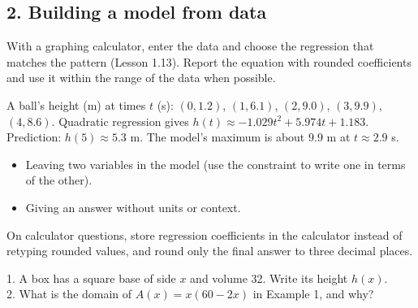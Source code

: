 \subsection*{2. Building a model from data}
With a graphing calculator, enter the data and choose the regression that matches the pattern (Lesson 1.13). Report the equation with rounded coefficients and use it within the range of the data when possible.

\begin{example}
A ball's height (m) at times $t$ (s): $(0,1.2)$, $(1,6.1)$, $(2,9.0)$, $(3,9.9)$, $(4,8.6)$.
\sol Quadratic regression gives $h(t)\approx-1.029t^2+5.974t+1.183$. Prediction: $h(5)\approx5.3$ m. The model's maximum is about $9.9$ m at $t\approx2.9$ s.
\end{example}

\begin{mistakes}
\begin{itemize}
\item Leaving two variables in the model (use the constraint to write one in terms of the other).
\item Giving an answer without units or context.
\end{itemize}
\end{mistakes}

\begin{aptip}
On calculator questions, store regression coefficients in the calculator instead of retyping rounded values, and round only the final answer to three decimal places.
\end{aptip}

\begin{quickcheck}
1. A box has a square base of side $x$ and volume 32. Write its height $h(x)$.\\
2. What is the domain of $A(x)=x(60-2x)$ in Example 1, and why?
\end{quickcheck}
